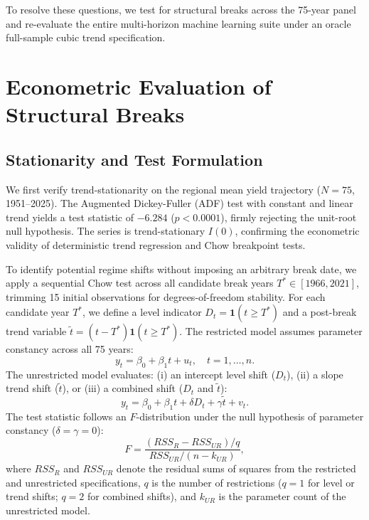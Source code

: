 To resolve these questions, we test for structural breaks across the 75-year panel and re-evaluate the entire multi-horizon machine learning suite under an oracle full-sample cubic trend specification.


\section{Econometric Evaluation of Structural Breaks}
\label{sec:app_chow_test}

\subsection{Stationarity and Test Formulation}
We first verify trend-stationarity on the regional mean yield trajectory ($N = 75$, 1951--2025). The Augmented Dickey-Fuller (ADF) test with constant and linear trend yields a test statistic of $-6.284$ ($p < 0.0001$), firmly rejecting the unit-root null hypothesis. The series is trend-stationary $I(0)$, confirming the econometric validity of deterministic trend regression and Chow breakpoint tests.

To identify potential regime shifts without imposing an arbitrary break date, we apply a sequential Chow test \citep{James2023} across all candidate break years $T^* \in [1966, 2021]$, trimming 15 initial observations for degrees-of-freedom stability. For each candidate year $T^*$, we define a level indicator $D_t = \mathbf{1}(t \ge T^*)$ and a post-break trend variable $\tilde{t} = (t - T^*) \mathbf{1}(t \ge T^*)$. The restricted model assumes parameter constancy across all 75 years:
\begin{equation}
    y_t = \beta_0 + \beta_1 t + u_t, \quad t = 1, \dots, n.
    \label{eq:chow_restricted}
\end{equation}
The unrestricted model evaluates: (i) an intercept level shift ($D_t$), (ii) a slope trend shift ($\tilde{t}$), or (iii) a combined shift ($D_t$ and $\tilde{t}$):
\begin{equation}
    y_t = \beta_0 + \beta_1 t + \delta D_t + \gamma \tilde{t} + v_t.
    \label{eq:chow_unrestricted}
\end{equation}
The test statistic follows an $F$-distribution under the null hypothesis of parameter constancy ($\delta = \gamma = 0$):
\begin{equation}
    F = \frac{(RSS_R - RSS_{UR}) / q}{RSS_{UR} / (n - k_{UR})},
    \label{eq:chow_f_stat}
\end{equation}
where $RSS_R$ and $RSS_{UR}$ denote the residual sums of squares from the restricted and unrestricted specifications, $q$ is the number of restrictions ($q=1$ for level or trend shifts; $q=2$ for combined shifts), and $k_{UR}$ is the parameter count of the unrestricted model.

